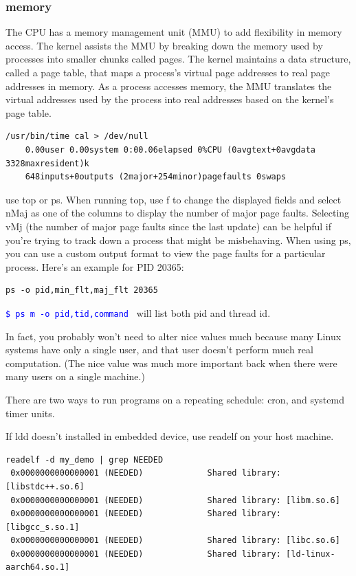 \documentclass[paper=8.5in:11in, twoside, 12pt, pagesize=pdftex]{book}
\newcommand{\linuxcommand}[1]{\texttt{\textcolor{blue}{\$ #1 \Pisymbol{psy}{191}}}}
\begin{document}
\subsubsection{memory}

	\par The CPU has a memory management unit (MMU) to add flexibility in memory access. The kernel assists the MMU by breaking down the memory used by processes into smaller chunks called pages. The kernel maintains a data structure, called a page table, that maps a process’s virtual page addresses to real page addresses in memory. As a process accesses memory, the MMU translates the virtual addresses used by the process into real addresses based on the kernel’s page table.
	
	\par
\begin{lstlisting}
/usr/bin/time cal > /dev/null
	0.00user 0.00system 0:00.06elapsed 0%CPU (0avgtext+0avgdata 3328maxresident)k
	648inputs+0outputs (2major+254minor)pagefaults 0swaps
\end{lstlisting} 
	
	
	\par use top or ps. When running top, use f to change the displayed fields and select nMaj as one of the columns to display the number of major page faults. Selecting vMj (the number of major page faults since the last update) can be helpful if you’re trying to track down a process that might be misbehaving. When using ps, you can use a custom output format to view the page faults for a particular process. Here’s an example for PID 20365:
\begin{lstlisting}
ps -o pid,min_flt,maj_flt 20365
\end{lstlisting}
	

	\par \linuxcommand{ps m -o pid,tid,command} will list both pid and thread id. 

	\par In fact, you probably won’t need to alter nice values much because many Linux systems have only a single user, and that user doesn’t perform much real computation. (The nice value was much more important back when there were many users on a single machine.)
	
	\par There are two ways to run programs on a repeating schedule: cron, and systemd timer units.

	\par If ldd doesn't installed in embedded device, use readelf on your host machine.
\begin{lstlisting}
readelf -d my_demo | grep NEEDED
 0x0000000000000001 (NEEDED)             Shared library: [libstdc++.so.6]
 0x0000000000000001 (NEEDED)             Shared library: [libm.so.6]
 0x0000000000000001 (NEEDED)             Shared library: [libgcc_s.so.1]
 0x0000000000000001 (NEEDED)             Shared library: [libc.so.6]
 0x0000000000000001 (NEEDED)             Shared library: [ld-linux-aarch64.so.1]
\end{lstlisting}
\end{document}
